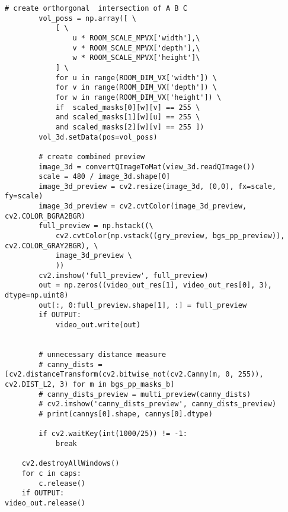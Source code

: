 \begin{lstlisting}[caption={Main function of the volume intersection program}, label={lst:app:volmain}]
        # create orthorgonal  intersection of A B C
        vol_poss = np.array([ \
            [ \
                u * ROOM_SCALE_MPVX['width'],\
                v * ROOM_SCALE_MPVX['depth'],\
                w * ROOM_SCALE_MPVX['height']\
            ] \
            for u in range(ROOM_DIM_VX['width']) \
            for v in range(ROOM_DIM_VX['depth']) \
            for w in range(ROOM_DIM_VX['height']) \
            if  scaled_masks[0][w][v] == 255 \
            and scaled_masks[1][w][u] == 255 \
            and scaled_masks[2][w][v] == 255 ])
        vol_3d.setData(pos=vol_poss)

        # create combined preview
        image_3d = convertQImageToMat(view_3d.readQImage())
        scale = 480 / image_3d.shape[0]
        image_3d_preview = cv2.resize(image_3d, (0,0), fx=scale, fy=scale)
        image_3d_preview = cv2.cvtColor(image_3d_preview, cv2.COLOR_BGRA2BGR)
        full_preview = np.hstack((\
            cv2.cvtColor(np.vstack((gry_preview, bgs_pp_preview)), cv2.COLOR_GRAY2BGR), \
            image_3d_preview \
            ))
        cv2.imshow('full_preview', full_preview)
        out = np.zeros((video_out_res[1], video_out_res[0], 3), dtype=np.uint8)
        out[:, 0:full_preview.shape[1], :] = full_preview
        if OUTPUT:
            video_out.write(out)


        # unnecessary distance measure
        # canny_dists = [cv2.distanceTransform(cv2.bitwise_not(cv2.Canny(m, 0, 255)), cv2.DIST_L2, 3) for m in bgs_pp_masks_b]
        # canny_dists_preview = multi_preview(canny_dists)
        # cv2.imshow('canny_dists_preview', canny_dists_preview)
        # print(cannys[0].shape, cannys[0].dtype)

        if cv2.waitKey(int(1000/25)) != -1:
            break

    cv2.destroyAllWindows()
    for c in caps:
        c.release()
    if OUTPUT:
video_out.release()

\end{lstlisting}